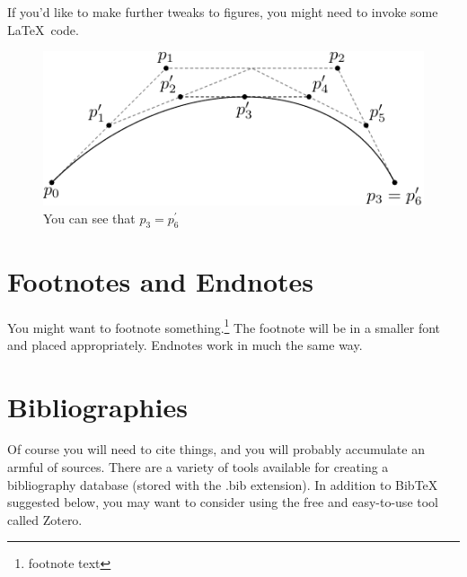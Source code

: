 \documentclass[12pt,twoside]{amherstthesis}
\begin{document}
  If you'd like to make further tweaks to figures, you might need to
  invoke some \LaTeX~code.
  
  \begin{Shaded}
  \begin{Highlighting}[]
  \NormalTok{(}\NormalTok{, }
         \NormalTok{,}
         \CharTok{\textbackslash{}\textbackslash{}}\NormalTok{,}
         \NormalTok{,}
         \NormalTok{)}
  \end{Highlighting}
  \end{Shaded}
  
  \begin{figure}[htbp]
  \centering
  \includegraphics[scale = 1,angle = 0]{figure/subdivision.pdf}
  \caption[Subdivision of arc segments]{\footnotesize{You can see that $p_3 = p_6^\prime$}}
  \label{fig:subd3}
  \end{figure}
  
  \section{Footnotes and Endnotes}\label{footnotes-and-endnotes}
  
  You might want to footnote something.\footnote{footnote text} The
  footnote will be in a smaller font and placed appropriately. Endnotes
  work in much the same way.
  
  \section{Bibliographies}\label{bibliographies}
  
  Of course you will need to cite things, and you will probably accumulate
  an armful of sources. There are a variety of tools available for
  creating a bibliography database (stored with the .bib extension). In
  addition to BibTeX suggested below, you may want to consider using the
  free and easy-to-use tool called Zotero.
  
\end{document}
